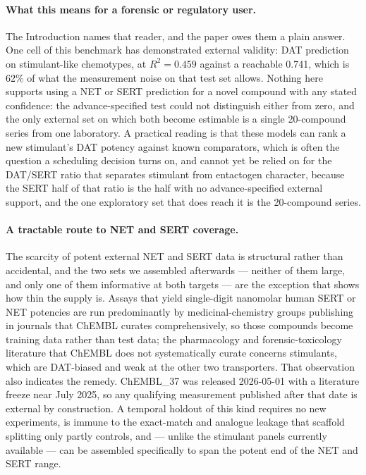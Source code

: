 \documentclass[11pt,a4paper]{article}
\begin{document}
\paragraph{What this means for a forensic or regulatory user.} The Introduction names
that reader, and the paper owes them a plain answer. One cell of this benchmark has
demonstrated external validity: DAT prediction on stimulant-like chemotypes, at
$R^2=0.459$ against a reachable 0.741, which is 62\% of what the measurement noise on that
test set allows. Nothing here supports using a NET or SERT prediction for a novel compound
with any stated confidence: the advance-specified test could not distinguish either from
zero, and the only external set on which both become estimable is a single 20-compound
series from one laboratory. A practical reading is that these models can rank a new
stimulant's DAT potency against known comparators, which is often the question a scheduling
decision turns on, and cannot yet be relied on for the DAT/SERT ratio that separates
stimulant from entactogen character, because the SERT half of that ratio is the half with
no advance-specified external support, and the one exploratory set that does reach it is
the 20-compound series.

\paragraph{A tractable route to NET and SERT coverage.} The scarcity of potent external
NET and SERT data is structural rather than accidental, and the two sets we assembled
afterwards --- neither of them large, and only one of them informative at both
targets --- are the exception that shows how thin the supply is. Assays that yield
single-digit
nanomolar human SERT or NET potencies are run predominantly by medicinal-chemistry
groups publishing in journals that ChEMBL curates comprehensively, so those compounds
become training data rather than test data; the pharmacology and forensic-toxicology
literature that ChEMBL does not systematically curate concerns stimulants, which are
DAT-biased and weak at the other two transporters. That observation also indicates the
remedy. ChEMBL\_37 was released 2026-05-01 with a literature freeze near July 2025, so
any qualifying measurement published after that date is external by construction. A
temporal holdout of this kind requires no new experiments, is immune to the exact-match
and analogue leakage that scaffold splitting only partly controls, and --- unlike the
stimulant panels currently available --- can be assembled specifically to span the
potent end of the NET and SERT range.
\end{document}
